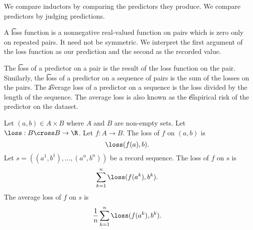 

We compare inductors by comparing the predictors they produce.
We compare predictors by judging predictions.


A \t{loss} function is a nonnegative real-valued function on pairs which is zero only on repeated pairs.
It need not be symmetric.
We interpret the first argument of the
loss function as our prediction
and the second as the recorded value.

The \t{loss of a predictor on a pair} is the
result of the loss function on the pair.
Similarly, the \t{loss of a predictor on  a sequence} of pairs is the sum of the losses on the pairs.
The \t{average loss of a predictor on a sequence} is the loss divided by the length of the sequence.
The average loss is also known as the \t{empirical risk} of the predictor on the dataset.


Let $(a, b) \in A \times B$
where $A$ and $B$ are non-empty sets.
Let $\loss: B \cross B \to \R$.
Let $f: A \to B$.
The loss of $f$ on $(a, b)$ is
\[
  \loss(f(a),b).
\]
Let $s = ((a^1, b^1), \dots, (a^n, b^n))$
be a record sequence.
The loss of $f$ on $s$ is
\[
  \sum_{k = 1}^{n} \loss(f(a^k), b^k).
\]
The average loss of $f$ on $s$ is
\[
  \frac{1}{n} \sum_{k = 1}^{n} \loss(f(a^k), b^k).
\]

